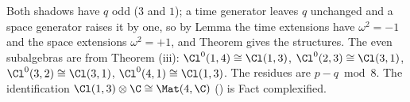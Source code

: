 Both shadows have $q$ odd ($3$ and $1$); a time generator leaves $q$ unchanged and a space generator raises it by one, so by Lemma  the time extensions have $\omega^{2} = -1$ and the space extensions $\omega^{2} = +1$, and Theorem  gives the structures. The even subalgebras are from Theorem (iii): $\Cl^{0}(1,4) \cong \Cl(1,3)$, $\Cl^{0}(2,3) \cong \Cl(3,1)$, $\Cl^{0}(3,2) \cong \Cl(3,1)$, $\Cl^{0}(4,1) \cong \Cl(1,3)$. The residues are $p - q \bmod 8$. The identification $\Cl(1,3) \otimes \C \cong \Mat(4,\C)$ () is Fact  complexified.
